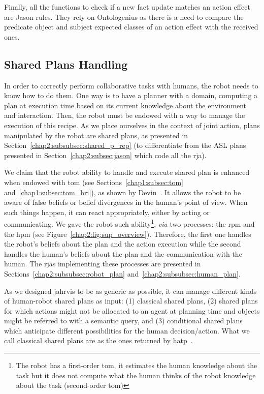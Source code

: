 \documentclass[a4paper,11pt,twoside]{StyleThese}
\begin{document}
Finally, all the functions to check if a new fact update matches an action effect are Jason rules. They rely on Ontologenius as there is a need to compare the predicate object and subject expected classes of an action effect with the received ones.

\subsection{Shared Plans Handling}\label{chap2:subsec:plan_handling}
In order to correctly perform collaborative tasks with humans, the robot needs to know how to do them. One way is to have a planner with a domain, computing a plan at execution time based on its current knowledge about the environment and interaction. Then, the robot must be endowed with a way to manage the execution of this recipe. As we place ourselves in the context of joint action, plans manipulated by the robot are shared plans, as presented in Section~\ref{chap2:subsubsec:shared_p_rep} (to differentiate from the ASL plans presented in Section~\ref{chap2:subsec:jason} which code all the \acrshort{rja}).

We claim that the robot ability to handle and execute shared plan is enhanced when endowed with \acrfull{tom} (see Sections~\ref{chap1:subsec:tom} and~\ref{chap1:subsec:tom_hri}), as shown by Devin~\cite{devin_2016_implemented}. It allows the robot to be aware of false beliefs or belief divergences in the human's point of view. When such things happen, it can react appropriately, either by acting or communicating. We gave the robot such ability\footnote{The robot has a first-order \acrshort{tom}, it estimates the human knowledge about the task but it does not compute what the human thinks of the robot knowledge about the task (second-order \acrshort{tom})}, \textit{via} two processes: the \acrfull{rpm} and the \acrfull{hpm} (see Figure~\ref{chap2:fig:sup_overview}). Therefore, the first one handles the robot's beliefs about the plan and the action execution while the second handles the human's beliefs about the plan and the communication with the human. The \acrshort{rja}s implementing these processes are presented in Sections~\ref{chap2:subsubsec:robot_plan} and~\ref{chap2:subsubsec:human_plan}.

As we designed \acrshort{jahrvis} to be as generic as possible, it can manage different kinds of human-robot shared plans as input: (1) classical shared plans, (2) shared plans for which actions might not be allocated to an agent at planning time and objects might be referred to with a semantic query, and (3) conditional shared plans which anticipate different possibilities for the human decision/action. What we call classical shared plans are as the ones returned by \acrfull{hatp}~\cite{lallement_2014_hatp}. 
\end{document}
